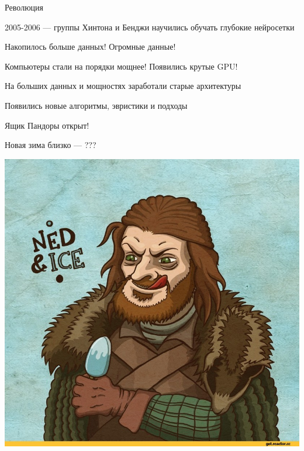 \documentclass[notes,12pt, aspectratio=169]{beamer}
\newenvironment{wideitemize}{\itemize\addtolength{\itemsep}{10pt}}{\enditemize}
\begin{document}
\begin{frame}{Революция}
	\begin{wideitemize}
		\item 2005-2006 — группы Хинтона и Бенджи научились обучать глубокие нейросетки

		\item Накопилось больше данных! Огромные данные!

		\item Компьютеры стали на порядки мощнее! Появились крутые GPU!

		\item На больших данных и мощностях заработали старые архитектуры

		\item Появились новые алгоритмы, эвристики и подходы

		\item Ящик Пандоры открыт!
	\end{wideitemize}
\end{frame}


{
\begin{frame}
\end{frame}
}


\begin{frame}{Новая зима близко  — ??? }
	\begin{center}
		\includegraphics[width=.6\linewidth]{stark_3.jpeg}
	\end{center}
\end{frame}
\end{document}
